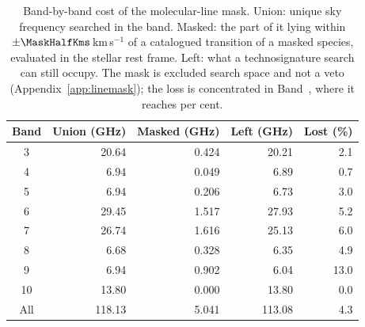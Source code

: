 \begin{table}
\centering
\footnotesize
\setlength{\tabcolsep}{4pt}
\caption{Band-by-band cost of the molecular-line mask. Union: unique sky frequency searched in the band. Masked: the part of it lying within $\pm\MaskHalfKms$\,km\,s$^{-1}$ of a catalogued transition of a masked species, evaluated in the stellar rest frame. Left: what a technosignature search can still occupy. The mask is excluded search space and not a veto (Appendix~\ref{app:linemask}); the loss is concentrated in Band~\FrMaskWorstBand, where it reaches \FrMaskWorstPct{} per cent.}
\label{tab:maskband}
\begin{tabular}{@{}crrrr@{}}
\hline
Band & Union (GHz) & Masked (GHz) & Left (GHz) & Lost (\%) \\
\hline
3 & 20.64 & 0.424 & 20.21 & 2.1 \\
4 & 6.94 & 0.049 & 6.89 & 0.7 \\
5 & 6.94 & 0.206 & 6.73 & 3.0 \\
6 & 29.45 & 1.517 & 27.93 & 5.2 \\
7 & 26.74 & 1.616 & 25.13 & 6.0 \\
8 & 6.68 & 0.328 & 6.35 & 4.9 \\
9 & 6.94 & 0.902 & 6.04 & 13.0 \\
10 & 13.80 & 0.000 & 13.80 & 0.0 \\
\hline
All & 118.13 & 5.041 & 113.08 & 4.3 \\
\hline
\end{tabular}
\end{table}
